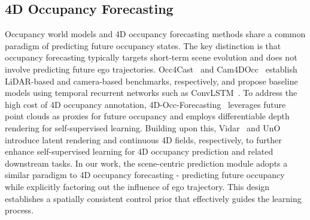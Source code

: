 \subsection{4D Occupancy Forecasting}
Occupancy world models and 4D occupancy forecasting methods share a common paradigm of predicting future occupancy states. 
The key distinction is that occupancy forecasting typically targets short-term scene evolution and does not involve predicting future ego trajectories. 
Occ4Cast~\cite{occ4cast} and Cam4DOcc~\cite{cam4docc} establish LiDAR-based and camera-based benchmarks, respectively, and propose baseline models using temporal recurrent networks such as ConvLSTM~\cite{convlstm}. 
To address the high cost of 4D occupancy annotation, 4D-Occ-Forecasting~\cite{4doccforecasting} leverages future point clouds as proxies for future occupancy and employs differentiable depth rendering for self-supervised learning. 
Building upon this, Vidar~\cite{vidar} and UnO~\cite{uno} introduce latent rendering and continuous 4D fields, respectively, to further enhance self-supervised learning for 4D occupancy prediction and related downstream tasks.
In our work, the scene-centric prediction module adopts a similar paradigm to 4D occupancy forecasting - predicting future occupancy while explicitly factoring out the influence of ego trajectory. 
This design establishes a spatially consistent control prior that effectively guides the learning process.%






